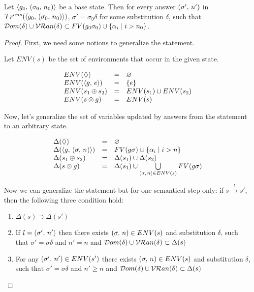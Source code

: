\begin{lemma}
\label{lem:update_substitutions_FV}

Let $\langle g_0 ,\, (\sigma_0 ,\, n_0) \rangle$ be a base state. Then for every answer $(\sigma' ,\, n')$ in $\mathcal{T}r^{ans}(\langle g_0 ,\, (\sigma_0 ,\, n_0) \rangle)$, $\sigma' = \sigma_0 \delta$ for some substitution $\delta$, such that $\mathcal{D}om(\delta) \cup \mathcal{VR}an(\delta) \subset FV(g_0 \sigma_0) \cup \{ \alpha_i \mid i > n_0 \}$.

\end{lemma}
\begin{proof}

First, we need some notions to generalize the statement.

Let $ENV(s)$ be the set of environments that occur in the given state.

\[ \begin{array}{lcl}
ENV(\Diamond) & = & \varnothing \\
ENV(\langle g ,\, e \rangle) & = & \{ e \} \\
ENV(s_1 \oplus s_2) & = & ENV(s_1) \cup ENV(s_2) \\
ENV(s \otimes g) & = & ENV(s) 
\end{array} \]

Now, let's generalize the set of variables updated by answers from the statement to an arbitrary state.

\[ \begin{array}{lcl}
\Delta(\Diamond) & = & \varnothing \\
\Delta(\langle g ,\, (\sigma ,\, n) \rangle) & = & FV(g \sigma) \cup \{ \alpha_i \mid i > n \} \\
\Delta(s_1 \oplus s_2) & = & \Delta(s_1) \cup \Delta(s_2) \\
\Delta(s \otimes g) & = & \Delta(s_1) \cup \bigcup\limits_{(\sigma ,\, n) \in ENV(s)} FV(g \sigma)
\end{array} \]

Now we can generalize the statement but for one semantical step only: if $s \xrightarrow{l} s'$, then the following three condition hold:

\begin{enumerate}
\item $\Delta(s) \supset \Delta(s')$
\item If $l = (\sigma' ,\, n')$ then there exists $(\sigma ,\, n) \in ENV(s)$ and substitution $\delta$, such that $\sigma' = \sigma \delta$ and $n' = n$ and $\mathcal{D}om(\delta) \cup \mathcal{VR}an(\delta) \subset \Delta(s)$
\item For any $(\sigma' ,\, n') \in ENV(s')$ there exists $(\sigma ,\, n) \in ENV(s)$ and substitution $\delta$, such that $\sigma' = \sigma \delta$ and $n' \ge n$ and $\mathcal{D}om(\delta) \cup \mathcal{VR}an(\delta) \subset \Delta(s)$
\end{enumerate}


\end{proof}
